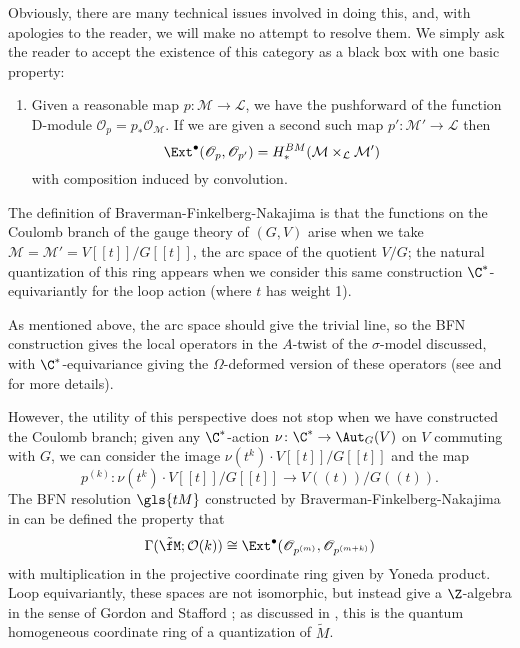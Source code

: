 Obviously, there
are many technical issues involved in doing this, and, with apologies
to the reader, we will make no attempt to resolve them.
We simply
ask the reader to accept the existence of this category as a black box
with one basic property:
\begin{enumerate}
\item Given a reasonable map $p\colon \mathcal{M}\to \mathcal{L}$, we
  have the pushforward of the function D-module
  $\mathscr{O}_p=p_*\mathcal{O}_{\mathcal{M}}$.  If we are given a second
  such map $p'\colon \mathcal{M}'\to \mathcal{L}$ then 
  \[\Ext^\bullet(\mathscr{O}_p,
   \mathscr{O}_{p'})=H^{BM}_*(\mathcal{M}\times_{\mathcal{L}}\mathcal{M'})\]
 with composition induced by convolution.  
\end{enumerate}
The definition of Braverman-Finkelberg-Nakajima is that the functions
on the Coulomb branch  of the gauge theory of $(G,V)$ arise when we
take $\mathcal{M}=\mathcal{M}'=V[[t]]/G[[t]]$, the arc space of the
quotient $V/G$; the natural quantization of this ring
appears when we consider this same construction $\C^*$-equivariantly for the
loop action (where $t$ has weight 1).
\begin{physics}
  As mentioned above, the arc space should give the trivial line, so
  the BFN construction gives the local operators in the $A$-twist of
  the $\sigma$-model discussed, with $\C^*$-equivariance giving the
  $\Omega$-deformed version of these operators (see \cite{NaCoulomb}
  and \cite[\S
  1.3]{BBBDN} for more details).
\end{physics}



However, the utility of this perspective does not stop when we have
constructed the Coulomb branch; given any $\C^*$-action $\nu\colon \C^*
\to \Aut_G(V)$ on $V$
commuting with $G$, we can consider the image $\nu(t^k)\cdot
V[[t]]/G[[t]]$ and the map \[p^{(k)}\colon \nu(t^k)\cdot
V[[t]]/G[[t]]\to V((t))/G((t)).\]  The
BFN resolution $\gls{tM}$ constructed by
Braverman-Finkelberg-Nakajima in \cite{BFNline} can be defined  the
property that \[\Gamma(\tilde{\fM}; \mathcal{O}(k))\cong
  \Ext^\bullet(\mathscr{O}_{p^{(m)}}, \mathscr{O}_{p^{(m+k)}})\] with
multiplication in the projective coordinate ring given by Yoneda
product.  
 Loop equivariantly, these spaces are not isomorphic, but instead give a $\Z$-algebra
in the sense of Gordon and Stafford \cite{GS}; as discussed in
\cite[\S 5.2]{BLPWquant}, this is the quantum homogeneous coordinate
ring of a quantization of $\tilde{M}$.



